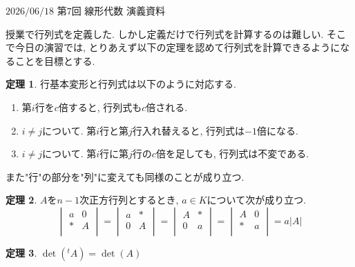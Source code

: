\documentclass[dvipdfmx,a4paper,11pt]{article} %
\theoremstyle{definition}
\newtheorem{thm}{定理}
\begin{document}
 \newpage
 $\boxed{\text{2026/06/18 第7回 線形代数 演義資料}}$
  
  授業で行列式を定義した. しかし定義だけで行列式を計算するのは難しい.
  そこで今日の演習では, とりあえず以下の定理を認めて行列式を計算できるようになることを目標とする. 
  
\begin{thm}\cite[定理 3.2.5, 3.2.9]{O}
行基本変形と行列式は以下のように対応する. 
   \begin{enumerate}
 \item  第$i$行を$c$倍すると, 行列式も$c$倍される.
 \item $i \neq j$について. 第$i$行と第$j$行入れ替えると, 行列式は$-1$倍になる. 
 \item $i \neq j$について. 第$i$行に第$j$行の$c$倍を足しても, 行列式は不変である. 
 \end{enumerate}
 また"行"の部分を"列"に変えても同様のことが成り立つ. 
  \end{thm}
  \vspace{-6pt}
  \begin{thm}\cite[定理 3.3.2]{O}
  $A$を$n-1$次正方行列とするとき, $a \in K$について次が成り立つ.
  $$
  \begin{vmatrix}
a & 0\\
\ast &   A\\
\end{vmatrix}
=
  \begin{vmatrix}
a & \ast \\
0 &   A\\
\end{vmatrix}
=
  \begin{vmatrix}
A & \ast \\
0 &   a\\
\end{vmatrix}
=
  \begin{vmatrix}
A & 0 \\
\ast &   a\\
\end{vmatrix}
=a |A|
$$
  \end{thm}
    \vspace{-6pt}
   \begin{thm}\cite[定理 3.2.8]{O}
$\det({}^t A)  = \det (A)$
\end{thm}
\end{document}
